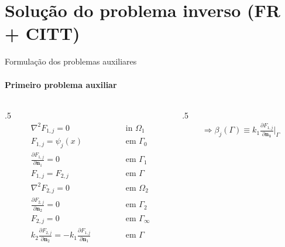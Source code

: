 \documentclass{beamer}
\begin{document}
\section{Solução do problema inverso (FR + CITT)}
\begin{frame}{Formulação dos problemas auxiliares}
	\framesubtitle{Primeiro problema auxiliar}
	\begin{columns}
	\begin{column}{.5\textwidth}
	\begin{subequations}
		\begin{alignat*}{2}
		& \nabla^2 F_{1,j} = 0 \quad\quad\quad\quad && \text{ in } \Omega_1  \\
		& F_{1,j} = \psi_j(x) && \text{ em } \Gamma_0   \\
		& \frac{\partial F_{1,j}}{\partial \mathbf{n}_1} = 0 && \text{ em }  \Gamma_1  \\ 
		& F_{1,j} = F_{2, j} \quad\quad\quad\quad\quad && \text{ em }  \Gamma \\
		& \nabla^2 F_{2,j} = 0 && \text{ em }  \Omega_2 \\
		& \frac{\partial F_{2,j}}{\partial \mathbf{n}_2} = 0 && \text{ em }  \Gamma_2 \\
		& F_{2,j} = 0 && \text{ em }  \Gamma_\infty \\
		& k_2\frac{\partial F_{2, j}}{\partial\mathbf{n}_2} = - k_1\frac{\partial F_{1,j}}{\partial\mathbf{n}_1} && \text{ em }  \Gamma 
		\end{alignat*}
	\end{subequations}
	\end{column}
	
	\begin{column}{.5\textwidth}
		\begin{align*}
		\Rightarrow \beta_j(\Gamma) \equiv k_1 \frac{\partial F_{1,j}}{\partial\mathbf{n_1}}\bigg|_\Gamma
		\end{align*}
	\end{column}
	\end{columns}
	
	\begin{center}
	\end{center}
\end{frame}
\end{document}
